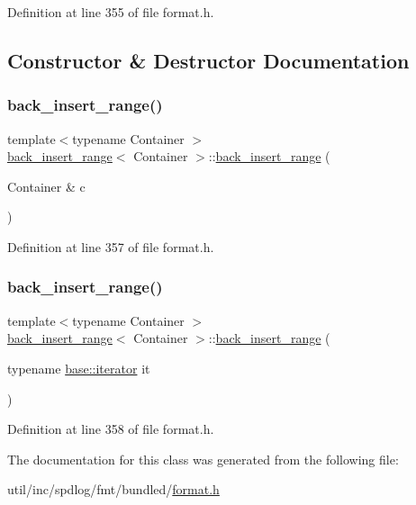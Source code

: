 Definition at line 355 of file format.\+h.



\subsection{Constructor \& Destructor Documentation}
\mbox{\label{classback__insert__range_a9ec53a98255fd8c56fd6038400be0ba8}} 
\subsubsection{\texorpdfstring{back\+\_\+insert\+\_\+range()}{back\_insert\_range()}\hspace{0.1cm}{\footnotesize\ttfamily [1/2]}}
{\footnotesize\ttfamily template$<$typename Container $>$ \\
\hyperlink{classback__insert__range}{back\+\_\+insert\+\_\+range}$<$ Container $>$\+::\hyperlink{classback__insert__range}{back\+\_\+insert\+\_\+range} (\begin{DoxyParamCaption}\item[{Container \&}]{c }\end{DoxyParamCaption})\hspace{0.3cm}{\ttfamily [inline]}}



Definition at line 357 of file format.\+h.

\mbox{\label{classback__insert__range_a5ae08e1f54068a6a3e6e9cbf6af158c5}} 
\subsubsection{\texorpdfstring{back\+\_\+insert\+\_\+range()}{back\_insert\_range()}\hspace{0.1cm}{\footnotesize\ttfamily [2/2]}}
{\footnotesize\ttfamily template$<$typename Container $>$ \\
\hyperlink{classback__insert__range}{back\+\_\+insert\+\_\+range}$<$ Container $>$\+::\hyperlink{classback__insert__range}{back\+\_\+insert\+\_\+range} (\begin{DoxyParamCaption}\item[{typename \hyperlink{classoutput__range_ad58eda348d78f3d205ed58a632d75a83}{base\+::iterator}}]{it }\end{DoxyParamCaption})\hspace{0.3cm}{\ttfamily [inline]}}



Definition at line 358 of file format.\+h.



The documentation for this class was generated from the following file\+:\begin{DoxyCompactItemize}
\item 
util/inc/spdlog/fmt/bundled/\hyperlink{format_8h}{format.\+h}\end{DoxyCompactItemize}
